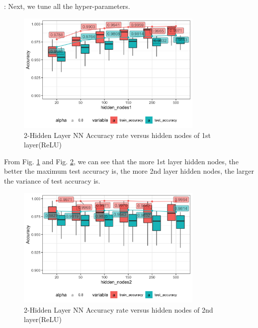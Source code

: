 \documentclass[8pt]{beamer}
\begin{document}
\begin{frame}[allowframebreaks]{\secname : \subsecname}
Next, we tune all the hyper-parameters.
\begin{figure}[htbp]
\centerline{\includegraphics[width=0.8\textwidth]{figure/2-Hidden Layer Neural Network Accuracy rate versus hidden_nodes1.png}}
\caption{2-Hidden Layer NN Accuracy rate versus hidden nodes of 1st layer(ReLU)}
\label{2-Hidden Layer Neural Network Accuracy rate versus hidden nodes of 1st layer(ReLU)}
\vspace{-1.5em}
\end{figure}
From Fig. \ref{2-Hidden Layer Neural Network Accuracy rate versus hidden nodes of 1st layer(ReLU)} and Fig. \ref{2-Hidden Layer Neural Network Accuracy rate versus hidden nodes of 2nd layer(ReLU)}, we can see that the more 1st layer hidden nodes, the better the maximum test accuracy is, the more 2nd layer hidden nodes, the larger the variance of test accuracy is.
\begin{figure}[htbp]
\centerline{\includegraphics[width=0.8\textwidth]{figure/2-Hidden Layer Neural Network Accuracy rate versus hidden_nodes2.png}}
\caption{2-Hidden Layer NN Accuracy rate versus hidden nodes of 2nd layer(ReLU)}
\label{2-Hidden Layer Neural Network Accuracy rate versus hidden nodes of 2nd layer(ReLU)}
\end{figure}


\end{frame}
\end{document}
